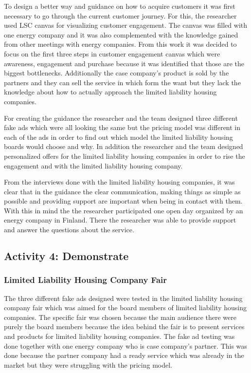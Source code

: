 To design a better way and guidance on how to acquire customers it was first necessary to go through the current customer journey. For this, the researcher used LSC canvas for visualizing customer engagement. The canvas was filled with one energy company and it was also complemented with the knowledge gained from other meetings with energy companies. From this work it was decided to focus on the first three steps in customer engagement canvas which were awareness, engagement and purchase because it was identified that those are the biggest bottlenecks. Additionally the case company's product is sold by the partners and they can sell the service in which form the want but they lack the knowledge about how to actually approach the limited liability housing companies.

For creating the guidance the researcher and the team designed three different fake ads which were all looking the same but the pricing model was different in each of the ads in order to find out which model the limited liability housing boards would choose and why. In addition the researcher and the team designed personalized offers for the limited liability housing companies in order to rise the engagement and with the limited liability housing company.

From the interviews done with the limited liability housing companies, it was clear that in the guidance the clear communication, making things as simple as possible and providing support are important when being in contact with them. With this in mind the the researcher participated one open day organized by an energy company in Finland. There the researcher was able to provide support and answer the questions about the service.

\subsection{Activity 4: Demonstrate}

\subsubsection*{Limited Liability Housing Company Fair}
The three different fake ads designed were tested in the limited liability housing company fair which was aimed for the board members of limited liability housing companies. The specific fair was chosen because the main audience there were purely the board members because the idea behind the fair is to present services and products for limited liability housing companies. The fake ad testing was done together with one energy company who is case company's partner. This was done because the partner company had a ready service which was already in the market but they were struggling with the pricing model.

